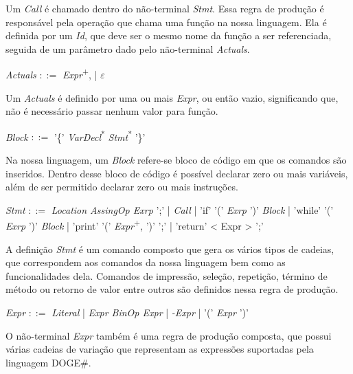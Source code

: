 \documentclass{scrreprt}
\begin{document}
\par Um \textit{Call} é chamado dentro do não-terminal \textit{Stmt}. Essa regra de produção é responsável pela operação que chama uma função na nossa linguagem. Ela é definida por um \textit{Id}, que deve ser o mesmo nome da função a ser referenciada, seguida de um parâmetro dado pelo não-terminal \textit{Actuals}.

\begin{center}
\textit{Actuals }$::=$\textit{ Expr}\textsuperscript{+}, | $\varepsilon$
\end{center}

\par Um \textit{Actuals} é definido por uma ou mais \textit{Expr}, ou então vazio, significando que, não é necessário passar nenhum valor para função. 

\begin{center}
\textit{Block }$::=$ '\{' \textit{ VarDecl}\textsuperscript{*} \textit{ Stmt}\textsuperscript{*} '\}'
\end{center}

\par Na nossa linguagem, um \textit{Block} refere-se bloco de código em que os comandos são inseridos. Dentro desse bloco de código é possível declarar zero ou mais variáveis, além de ser permitido declarar zero ou mais instruções. 

\begin{center}
\textit{Stmt }$::=$\textit{ Location AssingOp Exrp} ';' |\textit{ Call} | 'if' '(' \textit{Exrp} ')'\textit{ Block} |  'while' '(' \textit{Exrp} ')'\textit{ Block} |  'print' '(' \textit{ Expr}\textsuperscript{+}, ')' ';' | 'return' < Expr > ';'
\end{center}

\par A definição \textit{Stmt} é um comando composto que gera os vários tipos de cadeias, que correspondem aos comandos da nossa linguagem bem como as funcionalidades dela. Comandos de impressão, seleção, repetição, término de método ou retorno de valor entre outros são definidos nessa regra de produção. 

\begin{center}
\textit{Expr }$::=$\textit{ Literal} |\textit{ Expr BinOp Expr} | \textit{ -Expr} | '(' \textit{Expr} ')'  
\end{center}

\par O não-terminal \textit{Expr} também é uma regra de produção composta, que possui várias cadeias de variação que representam as expressões suportadas pela linguagem DOGE\#. 
\end{document}
